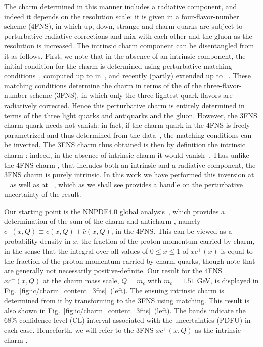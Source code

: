 The charm \pdf determined in this manner includes a  radiative component, and
indeed it depends on the resolution scale: it is  given in a four-flavor-number
scheme (4FNS), in which up,  down, strange and charm quarks are subject to 
perturbative radiative corrections and mix with each other and the gluon as the
resolution is increased.
%
The intrinsic charm component can be disentangled from it as follows.
%
First, we note that in the absence of an intrinsic component, the initial
condition for the charm \pdf is determined using perturbative matching
conditions~\cite{Collins:1986mp}, computed  up to \nnlo in~\cite{pdfnnlo},
and recently (partly) extended up to \nnnlo~\cite{Bierenbaum:2009zt,Bierenbaum:2009mv,Ablinger:2010ty,Ablinger:2014vwa,Ablinger:2014uka,Behring:2014eya,Ablinger_2014,Ablinger:2014nga,Blumlein:2017wxd}.
%
These matching conditions  determine the charm \pdf in terms of the \pdfs of the
three-flavor-number-scheme (3FNS), in which only the three lightest quark 
flavors are radiatively corrected.
%
Hence this perturbative charm \pdf is entirely determined in terms of the three
light quarks and antiquarks and the gluon.
%
However, the 3FNS charm quark \pdf needs not
vanish: in fact, if the charm quark \pdf in the 4FNS is freely
parametrized and thus determined from the data~\cite{Ball:2015tna},
the matching conditions can be inverted.
%
The 3FNS charm \pdf
thus obtained is then by definition the intrinsic charm \pdf: indeed, in
the absence of intrinsic charm it would vanish~\cite{Ball:2015dpa}. 
Thus unlike the 4FNS charm \pdf, that
includes both an intrinsic and a radiative
component, the 3FNS charm
\pdf is purely intrinsic.
%
In this work we have performed this inversion at
\nnlo~\cite{pdfnnlo} as well as at \nnnlo~\cite{Bierenbaum:2009zt,Bierenbaum:2009mv,Ablinger:2010ty,Ablinger:2014vwa,Ablinger:2014uka,Behring:2014eya,Ablinger_2014,Ablinger:2014nga,Blumlein:2017wxd},
which as we shall see provides a handle on the perturbative uncertainty of the \nnlo result.

Our starting point is the NNPDF4.0 global
analysis~\cite{Ball:2021leu}, which provides a determination of
the sum of the charm and
anticharm \pdfs, namely  $c^+(x,Q)\equiv c(x,Q)+\bar  c(x,Q)$, in the
4FNS. 
This can be viewed 
as a probability density in $x$, the fraction of the proton momentum
carried by charm, in the sense that the integral over all 
values of $0\le x\le1$ of 
$xc^+(x)$ is equal to  the fraction of
the proton momentum carried by charm quarks, though note that \pdfs are
generally not necessarily positive-definite. 
%
Our result for  the 4FNS $xc^+(x,Q)$  at
the charm mass scale, $Q=m_c$ with $m_c=1.51$ GeV, 
is displayed in Fig.~\ref{fig:ic/charm_content_3fns}~(left).
%
%
The ensuing intrinsic charm is determined from it
by transforming to the 3FNS using
\nnlo matching.
%
This result is also shown 
in Fig.~\ref{fig:ic/charm_content_3fns}~(left).
The bands  indicate the 68\% confidence level (CL) interval
associated with the \pdf uncertainties  (PDFU) in each case.  Henceforth, we will refer to
the  3FNS $xc^+(x,Q)$ \pdf as the
intrinsic charm \pdf. 

